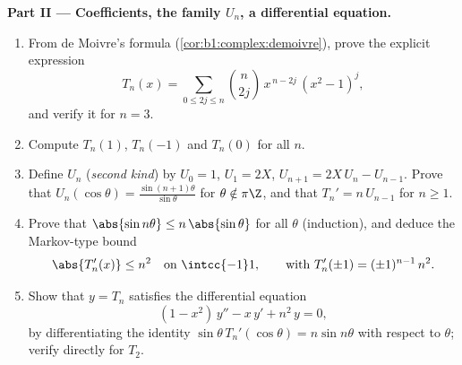 \begin{problem}
\medskip
\noindent\textbf{Part II --- Coefficients, the family $U_n$, a
differential equation.}
\begin{enumerate}[resume]
  \item From de Moivre's formula
        (\cref{cor:b1:complex:demoivre}), prove the explicit
        expression
        \[
        T_n(x) = \sum_{0 \leq 2j \leq n} \binom{n}{2j}\,
        x^{\,n-2j}\,(x^2 - 1)^j ,
        \]
        and verify it for $n = 3$.
  \item Compute $T_n(1)$, $T_n(-1)$ and $T_n(0)$ for all $n$.
  \item Define $U_n$ (\emph{second kind}) by $U_0 = 1$, $U_1 =
        2X$, $U_{n+1} = 2X\,U_n - U_{n-1}$. Prove that
        $U_n(\cos\theta) = \frac{\sin(n+1)\theta}{\sin\theta}$
        for $\theta \notin \pi\Z$, and that $T_n' = n\,U_{n-1}$
        for $n \geq 1$.
  \item Prove that $\abs{\sin n\theta} \leq n\,\abs{\sin\theta}$
        for all $\theta$ (induction), and deduce the Markov-type
        bound
        \[
        \abs{T_n'(x)} \leq n^2
        \quad\text{on } \intcc{-1}1,
        \qquad\text{with } T_n'(\pm1) = (\pm1)^{n-1}\,n^2 .
        \]
  \item Show that $y = T_n$ satisfies the differential equation
        \[
        (1 - x^2)\,y'' - x\,y' + n^2\,y = 0 ,
        \]
        by differentiating the identity $\sin\theta\,
        T_n'(\cos\theta) = n\sin n\theta$ with respect to
        $\theta$; verify directly for $T_2$.
\end{enumerate}


\end{problem}
